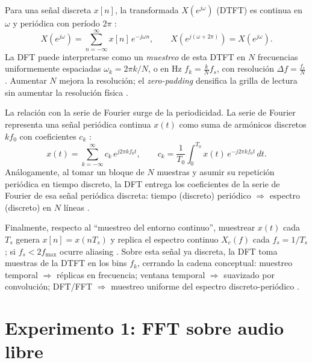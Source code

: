 \documentclass[letter,12pt]{article}
\begin{document}
Para una señal discreta \(x[n]\), la transformada \(X(e^{j\omega})\) (DTFT) es continua en \(\omega\) y periódica con período \(2\pi\) \cite{OppenheimSchaferDTSP3e,NISTDLMF_Fourier}:
\[
X(e^{j\omega})=\sum_{n=-\infty}^{\infty} x[n]\,e^{-j\omega n},\qquad
X(e^{j(\omega+2\pi)})=X(e^{j\omega}).
\]
La DFT puede interpretarse como un \emph{muestreo} de esta DTFT en \(N\) frecuencias uniformemente espaciadas \( \omega_k=2\pi k/N \), o en Hz \( f_k=\tfrac{k}{N}f_s \), con resolución \(\Delta f=\tfrac{f_s}{N}\) \cite{OppenheimSchaferDTSP3e,VetterliKovacevicGoyalFSP2014,SciPyFFT2024}. Aumentar \(N\) mejora la resolución; el \emph{zero-padding} densifica la grilla de lectura sin aumentar la resolución física \cite{SciPyFFT2024,NumPyFFT2024}.

La relación con la serie de Fourier surge de la periodicidad. La serie de Fourier representa una señal periódica continua \(x(t)\) como suma de armónicos discretos \(k f_0\) con coeficientes \(c_k\) \cite{OsgoodFTAMS2019,NISTDLMF_Fourier}:
\[
x(t)=\sum_{k=-\infty}^{\infty} c_k\,e^{j2\pi k f_0 t},\qquad
c_k=\frac{1}{T_0}\int_{0}^{T_0} x(t)\,e^{-j2\pi k f_0 t}\,dt.
\]
Análogamente, al tomar un bloque de \(N\) muestras y asumir su repetición periódica en tiempo discreto, la DFT entrega los coeficientes de la serie de Fourier de esa señal periódica discreta: tiempo (discreto) periódico \(\Rightarrow\) espectro (discreto) en \(N\) líneas \cite{OppenheimSchaferDTSP3e,VetterliKovacevicGoyalFSP2014}.

Finalmente, respecto al “muestreo del entorno continuo”, muestrear \(x(t)\) cada \(T_s\) genera \(x[n]=x(nT_s)\) y replica el espectro continuo \(X_c(f)\) cada \(f_s=1/T_s\); si \(f_s<2f_{\max}\) ocurre aliasing \cite{OppenheimSchaferDTSP3e,OsgoodFTAMS2019}. Sobre esta señal ya discreta, la DFT toma muestras de la DTFT en los bins \(f_k\), cerrando la cadena conceptual: muestreo temporal \(\Rightarrow\) réplicas en frecuencia; ventana temporal \(\Rightarrow\) suavizado por convolución; DFT/FFT \(\Rightarrow\) muestreo uniforme del espectro discreto-periódico \cite{OppenheimSchaferDTSP3e,SciPyFFT2024}.



\section{Experimento 1: FFT sobre audio libre}
\end{document}
